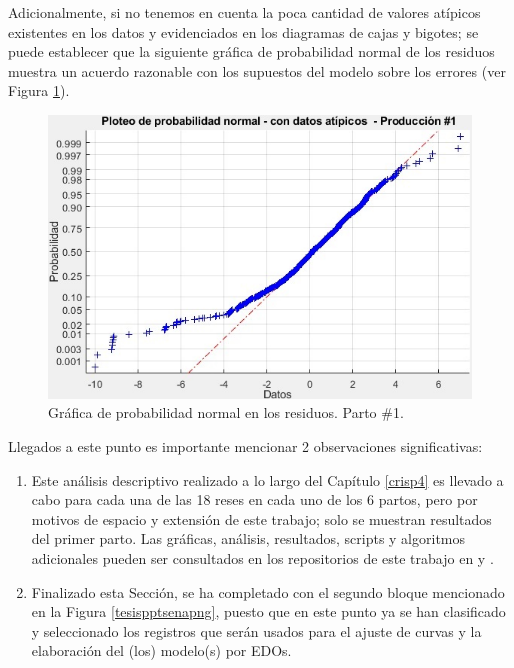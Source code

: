 Adicionalmente, si no tenemos en cuenta la poca cantidad de valores atípicos existentes en los datos y evidenciados en los diagramas de cajas y bigotes; se puede establecer que la siguiente gráfica de probabilidad normal de los residuos muestra un acuerdo razonable con los supuestos del modelo sobre los errores (ver Figura \ref{residprobnormpng}).

\begin{figure}[H]
	 \begin{center}
	 \includegraphics[scale=0.66]{img/residprobnormspa.jpg}
	 \end{center}
	 \caption{Gráfica de probabilidad normal en los residuos. Parto \#1. \label{residprobnormpng}}
\end{figure}

Llegados a este punto es importante mencionar 2 observaciones significativas:

\begin{enumerate}
    \item Este análisis descriptivo realizado a lo largo del Capítulo \ref{crisp4} es llevado a cabo para cada una de las 18 reses en cada uno de los 6 partos, pero por motivos de espacio y extensión de este trabajo; solo se muestran resultados del primer parto. Las gráficas, análisis, resultados, scripts y algoritmos adicionales pueden ser consultados en los repositorios de este trabajo en \cite{msclfggrepo} y \cite{msclfggprogrepo}. 
    \item Finalizado esta Sección, se ha completado con el segundo bloque mencionado en la Figura \ref{tesispptsenapng}, puesto que en este punto ya se han clasificado y seleccionado los registros que serán usados para el ajuste de curvas y la elaboración del (los) modelo(s) por EDOs.
\end{enumerate}


